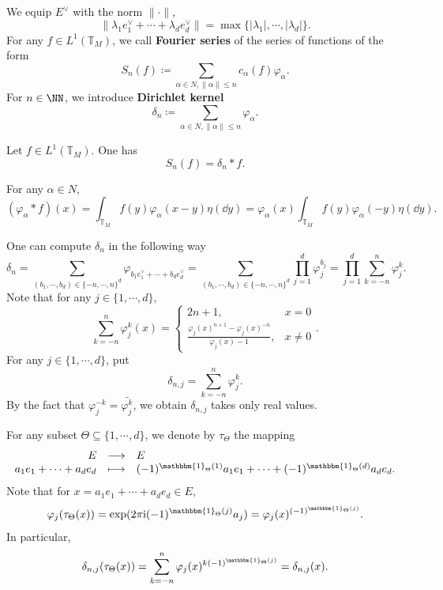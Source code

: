 \begin{definitionenv}
    We equip $E^\vee$ with the norm $\|\cdot\|$,
    $$\|\lambda_1 e^\vee_1 + \cdots + \lambda_d e^\vee_d\| = \max\{|\lambda_1|, \cdots, |\lambda_d|\}.$$
    For any $f \in L^1(\mathbb{T}_{M})$, we call \textbf{Fourier series} of the series of functions of the form
    $$S_{n} (f) \coloneq \sum_{\alpha \in N, \|\alpha\| \leq n} c_{\alpha}(f) \varphi_{\alpha}.$$
    For $n \in \NN$, we introduce \textbf{Dirichlet kernel}
    $$\delta_{n} \coloneq \sum_{\alpha \in N, \|\alpha\| \le n} \varphi_{\alpha}.$$
\end{definitionenv}

\begin{propositionenv}\label{prop:8.5.4}
    Let $f \in L^1(\mathbb{T}_{M})$.
    One has
    $$S_n(f) = \delta_{n} * f.$$
\end{propositionenv}
\begin{proofenv}
    For any $\alpha \in N$,
    $$(\varphi_{\alpha} * f)(x) = \int_{\mathbb{T}_{M}} f(y) \varphi_{\alpha}(x - y) \eta(\dd y) = \varphi_{\alpha}(x) \int_{\mathbb{T}_{M}}f(y) \varphi_{\alpha}(-y)\eta(\dd y).$$
\end{proofenv}

\begin{remark}\label{rem:8.5.5}
    One can compute $\delta_n$ in the following way
    $$\delta_n = \sum_{(b_1,\cdots,b_d) \in \{-n,\cdots,n\}^d} \varphi_{b_1e^\vee_1 + \cdots + b_de^\vee_d} = \sum_{(b_1,\cdots,b_d) \in \{-n,\cdots,n\}^d} \prod_{j = 1}^{d} \varphi_{j}^{b_j} = \prod_{j=1}^{d} \sum_{k=-n}^{n} \varphi_j^k.$$
    Note that for any $j \in \{1,\cdots,d\}$,
    $$\sum_{k=-n}^{n} \varphi_j^k (x) = \begin{cases}
        2n+1, & x = 0\\
        \frac{\varphi_j(x)^{n+1} - \varphi_{j}(x)^{-n}}{\varphi_{j}(x) - 1}, & x \neq 0
    \end{cases}.$$
    For any $j \in \{1,\cdots,d\}$, put
    $$\delta_{n,j} = \sum_{k=-n}^{n} \varphi_j^k.$$
    By the fact that $\varphi_{j}^{-k} = \bar{\varphi_{j}^{k}}$, we obtain $\delta_{n,j}$ takes only real values.
\end{remark}

\begin{definitionenv}
    For any subset $\Theta \subseteq \{1,\cdots,d\}$, we denote by $\tau_{\Theta}$ the mapping
    $$\begin{array}{rcl}
        E & \longrightarrow & E\\
        a_1 e_1 + \cdots + a_d e_d & \longmapsto & (-1)^{\mathbbm{1}_{\Theta}(1)} a_1 e_1 + \cdots + (-1)^{\mathbbm{1}_{\Theta}(d)} a_d e_d.
    \end{array}$$
    Note that for $x = a_1 e_1 + \cdots + a_d e_d \in E$,
    $$\varphi_{j} (\tau_{\Theta}(x)) = \exp(2 \pi \mathrm{i} (-1)^{\mathbbm{1}_{\Theta}(j)} a_j) = \varphi_{j} (x)^{(-1)^{\mathbbm{1}_{\Theta}(j)}}.$$
    In particular,
    $$\delta_{n,j} (\tau_{\Theta}(x)) = \sum_{k= - n}^{n} \varphi_{j}(x)^{k(-1)^{\mathbbm{1}_{\Theta}(j)}} = \delta_{n,j}(x).$$
\end{definitionenv}

